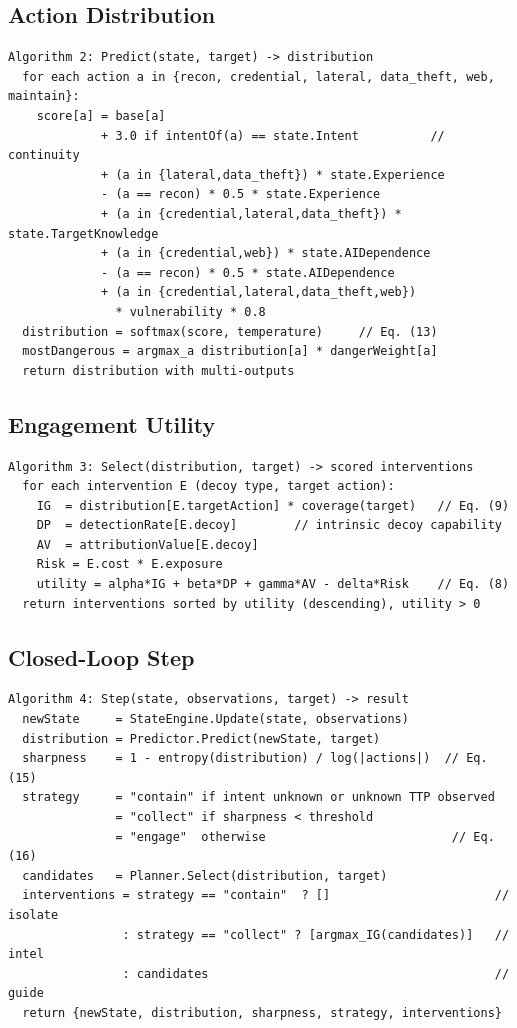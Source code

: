 \documentclass[preprints,article,accept,oneauthor]{Definitions/mdpi}
\begin{document}
\subsection{Action Distribution}
\label{sec:impl-predict}

\begin{verbatim}
Algorithm 2: Predict(state, target) -> distribution
  for each action a in {recon, credential, lateral, data_theft, web, maintain}:
    score[a] = base[a]
             + 3.0 if intentOf(a) == state.Intent          // continuity
             + (a in {lateral,data_theft}) * state.Experience
             - (a == recon) * 0.5 * state.Experience
             + (a in {credential,lateral,data_theft}) * state.TargetKnowledge
             + (a in {credential,web}) * state.AIDependence
             - (a == recon) * 0.5 * state.AIDependence
             + (a in {credential,lateral,data_theft,web})
               * vulnerability * 0.8
  distribution = softmax(score, temperature)     // Eq. (13)
  mostDangerous = argmax_a distribution[a] * dangerWeight[a]
  return distribution with multi-outputs
\end{verbatim}

\subsection{Engagement Utility}
\label{sec:impl-select}

\begin{verbatim}
Algorithm 3: Select(distribution, target) -> scored interventions
  for each intervention E (decoy type, target action):
    IG  = distribution[E.targetAction] * coverage(target)   // Eq. (9)
    DP  = detectionRate[E.decoy]        // intrinsic decoy capability
    AV  = attributionValue[E.decoy]
    Risk = E.cost * E.exposure
    utility = alpha*IG + beta*DP + gamma*AV - delta*Risk    // Eq. (8)
  return interventions sorted by utility (descending), utility > 0
\end{verbatim}

\subsection{Closed-Loop Step}
\label{sec:impl-loop}

\begin{verbatim}
Algorithm 4: Step(state, observations, target) -> result
  newState     = StateEngine.Update(state, observations)
  distribution = Predictor.Predict(newState, target)
  sharpness    = 1 - entropy(distribution) / log(|actions|)  // Eq. (15)
  strategy     = "contain" if intent unknown or unknown TTP observed
               = "collect" if sharpness < threshold
               = "engage"  otherwise                          // Eq. (16)
  candidates   = Planner.Select(distribution, target)
  interventions = strategy == "contain"  ? []                       // isolate
                : strategy == "collect" ? [argmax_IG(candidates)]   // intel
                : candidates                                        // guide
  return {newState, distribution, sharpness, strategy, interventions}
\end{verbatim}
\end{document}
